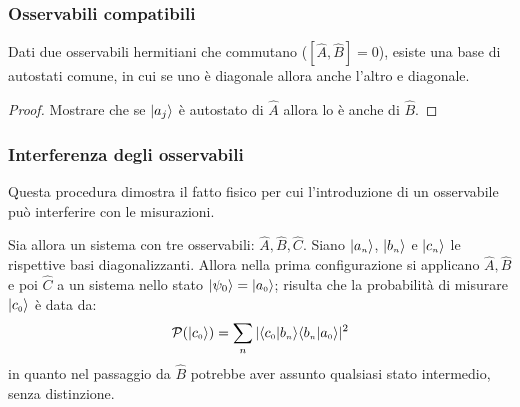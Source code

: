 \subsubsection*{Osservabili compatibili}
Dati due osservabili hermitiani che commutano ($[\hat A, \hat B] = 0$), esiste una base di autostati comune, in cui se uno è diagonale allora anche l'altro e diagonale.
\begin{proof}
	Mostrare che se $\Ket {a_{j}}$ è autostato di $\hat A$ allora lo è anche di $\hat B$.
\end{proof}

\subsubsection*{Interferenza degli osservabili}
Questa procedura dimostra il fatto fisico per cui l'introduzione di un osservabile può interferire con le misurazioni.

Sia allora un sistema con tre osservabili: $\hat A, \hat B, \hat C$. Siano $\Ket {a_{\scriptscriptstyle n}}$, $\Ket {b_{\scriptscriptstyle n}}$ e $\Ket {c_{\scriptscriptstyle n}}$ le rispettive basi diagonalizzanti. Allora nella prima configurazione si applicano $\hat A, \hat B$ e poi $\hat C$ a un sistema nello stato $\Ket {\psi_0} = \Ket {a_{\scriptscriptstyle 0}}$; risulta che la probabilità di misurare $\Ket{c_{\scriptscriptstyle 0}}$ è data da:
\[
	\P(\Ket {c_{\scriptscriptstyle 0}}) = \sum_{n}\abs{\braket{c_{\scriptscriptstyle 0}}{b_{\scriptscriptstyle n}}\braket{b_{\scriptscriptstyle n}}{a_{\scriptscriptstyle 0}}}^2
\]
in quanto nel passaggio da $\hat B$ potrebbe aver assunto qualsiasi stato intermedio, senza distinzione.

